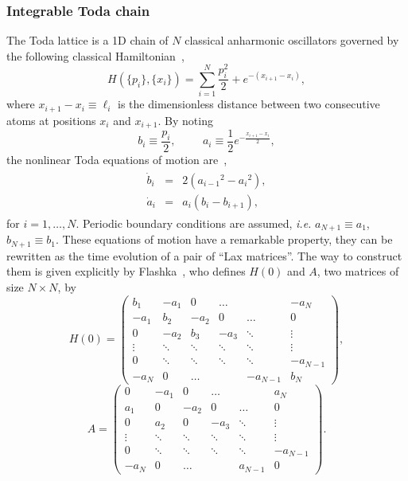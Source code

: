 \documentclass[]{revtex4-1}
\begin{document}
\subsubsection{Integrable Toda chain}

The Toda lattice is a 1D chain of $N$ classical anharmonic oscillators governed by the following classical Hamiltonian~\cite{Todabook},
\begin{equation} H(\{p_i \},\{ x_i\}) = \sum_{i=1}^N \frac{p_i^2}{2} + e^{-(x_{i+1}-x_i)}, \end{equation} where $x_{i+1}-x_i \equiv \ell_i$ is the dimensionless distance between two consecutive atoms at positions $x_i$ and $x_{i+1}$.
By noting
\begin{equation} b_i \equiv \frac{p_i}{2}, \hspace{1cm} a_i \equiv \frac{1}{2} e^{-\frac{x_{i+1}-x_i}{2}}, \end{equation} the nonlinear Toda equations of motion are~\cite{Todabook,Flashka},
\begin{eqnarray}
  \begin{aligned}
  \dot{b}_i &=& 2({a_{i-1}}^2-{a_i}^2), \label{eq1}\\
  \dot{a}_i &=& a_i (b_i-b_{i+1}), \end{aligned}
\end{eqnarray}
for $i=1,\dots,N$. 
Periodic boundary conditions are assumed, \textit{i.e.} $a_{N+1} \equiv a_1$, $b_{N+1} \equiv b_1$. 
These equations of motion have a remarkable property, they can be rewritten as the time evolution of a pair of ``Lax matrices''.
The way to construct them is given explicitly by Flashka~\cite{Flashka}, who defines $H(0)$ and $A$, two matrices of size $N \times N$, by 
\begin{equation}
   H(0)= \begin{pmatrix}
    b_1 & -a_1 & 0 &\dots &  & -a_{N}  \\
    -a_1 & b_2 & -a_2 & 0 & \dots & 0 \\
    0 & -a_2 & b_3 & -a_3 & \ddots & \vdots \\
      \vdots & \ddots & \ddots & \ddots & \ddots & \vdots \\
    0 & \ddots & \ddots & \ddots & \ddots & -a_{N-1} \\
    -a_{N} & 0 & \dots  & &  -a_{N-1} &  b_{N} 
  \end{pmatrix}, \label{eq0}
\end{equation}
\begin{equation}
 A= \begin{pmatrix}
    0 & -a_1 & 0 &\dots &  & a_{N}  \\
    a_1 & 0 & -a_2 & 0 & \dots & 0 \\
    0 & a_2 & 0 & -a_3 & \ddots & \vdots \\
      \vdots & \ddots & \ddots & \ddots & \ddots & \vdots \\
    0 & \ddots & \ddots & \ddots & \ddots & -a_{N-1} \\
    -a_{N} & 0 & \dots  & &  a_{N-1} &  0
      \end{pmatrix}.
\end{equation}
\end{document}
